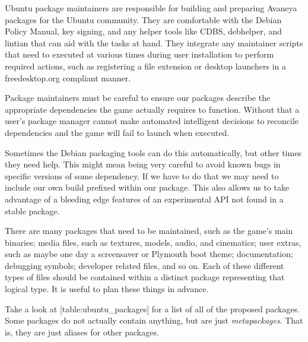 
Ubuntu package maintainers are responsible for building and preparing Avaneya packages for the Ubuntu community. They are comfortable with the Debian Policy Manual, key signing, and any helper tools like CDBS, debhelper, and lintian that can aid with the tasks at hand. They integrate any maintainer scripts that need to executed at various times during user installation to perform required actions, such as registering a file extension or desktop launchers in a freedesktop.org compliant manner.

Package maintainers must be careful to ensure our packages describe the appropriate dependencies the game actually requires to function. Without that a user's package manager cannot make automated intelligent decisions to reconcile dependencies and the game will fail to launch when executed. 

Sometimes the Debian packaging tools can do this automatically, but other times they need help. This might mean being very careful to avoid known bugs in specific versions of some dependency. If we have to do that we may need to include our own build prefixed within our package. This also allows us to take advantage of a bleeding edge features of an experimental API not found in a stable package.

There are many packages that need to be maintained, such as the game's main binaries; media files, such as textures, models, audio, and cinematics; user extras, such as maybe one day a screensaver or Plymouth boot theme; documentation; debugging symbols; developer related files, and so on. Each of these different types of files should be contained within a distinct package representing that logical type. It is useful to plan these things in advance.

Take a look at [table:ubuntu_packages] for a list of all of the proposed packages. Some packages do not actually contain anything, but are just {\it metapackages}. That is, they are just aliases for other packages.
\crlf

